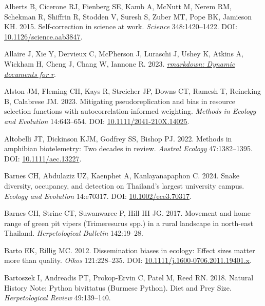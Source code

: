 \documentclass[10pt,a4paper]{article}
\newlength{\cslhangindent}
\newenvironment{CSLReferences}[2] %
 {\begin{list}{}{%
  \setlength{\itemindent}{0pt}
  \setlength{\leftmargin}{0pt}
  \setlength{\parsep}{0pt}
  \ifodd #1
   \setlength{\leftmargin}{\cslhangindent}
   \setlength{\itemindent}{-1\cslhangindent}
  \fi
  \setlength{\itemsep}{#2\baselineskip}}}
 {\end{list}}
\begin{document}
\label{refs}
\begin{CSLReferences}{1}{0}
Alberts B, Cicerone RJ, Fienberg SE, Kamb A, McNutt M, Nerem RM, Schekman R, Shiffrin R, Stodden V, Suresh S, Zuber MT, Pope BK, Jamieson KH. 2015. Self-correction in science at work. \emph{Science} 348:1420--1422. DOI: \href{https://doi.org/10.1126/science.aab3847}{10.1126/science.aab3847}.

Allaire J, Xie Y, Dervieux C, McPherson J, Luraschi J, Ushey K, Atkins A, Wickham H, Cheng J, Chang W, Iannone R. 2023. \emph{\href{https://github.com/rstudio/rmarkdown}{{rmarkdown}: Dynamic documents for r}}.

Alston JM, Fleming CH, Kays R, Streicher JP, Downs CT, Ramesh T, Reineking B, Calabrese JM. 2023. Mitigating pseudoreplication and bias in resource selection functions with autocorrelation‐informed weighting. \emph{Methods in Ecology and Evolution} 14:643--654. DOI: \href{https://doi.org/10.1111/2041-210X.14025}{10.1111/2041-210X.14025}.

Altobelli JT, Dickinson KJM, Godfrey SS, Bishop PJ. 2022. Methods in amphibian biotelemetry: {Two} decades in review. \emph{Austral Ecology} 47:1382--1395. DOI: \href{https://doi.org/10.1111/aec.13227}{10.1111/aec.13227}.

Barnes CH, Abdulaziz UZ, Kaenphet A, Kanlayanapaphon C. 2024. Snake diversity, occupancy, and detection on {Thailand}'s largest university campus. \emph{Ecology and Evolution} 14:e70317. DOI: \href{https://doi.org/10.1002/ece3.70317}{10.1002/ece3.70317}.

Barnes CH, Strine CT, Suwanwaree P, Hill III JG. 2017. Movement and home range of green pit vipers ({Trimeresurus} spp.) in a rural landscape in north-east {Thailand}. \emph{Herpetological Bulletin} 142:19--28.

Barto EK, Rillig MC. 2012. Dissemination biases in ecology: Effect sizes matter more than quality. \emph{Oikos} 121:228--235. DOI: \href{https://doi.org/10.1111/j.1600-0706.2011.19401.x}{10.1111/j.1600-0706.2011.19401.x}.

Bartoszek I, Andreadis PT, Prokop-Ervin C, Patel M, Reed RN. 2018. Natural {History} {Note}: {Python} bivittatus ({Burmese} {Python}). {Diet} and {Prey} {Size}. \emph{Herpetological Review} 49:139--140.


\end{CSLReferences}
\end{document}

